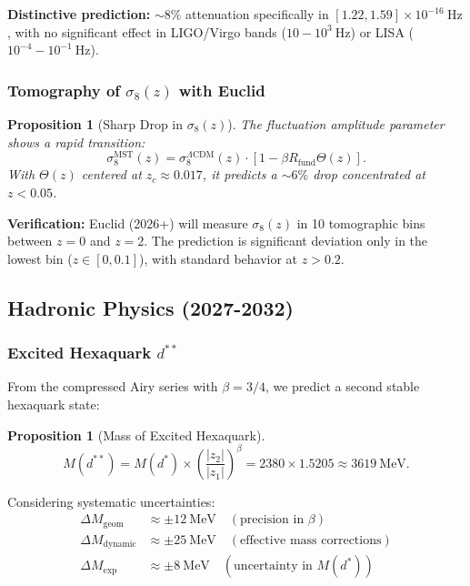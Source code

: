 \documentclass[11pt, a4paper]{article}
\theoremstyle{plain}
\newtheorem{proposition}[theorem]{Proposition}
\theoremstyle{definition}
\newcommand{\Rfactor}{R_{\text{fund}}}
\begin{document}
\textbf{Distinctive prediction:} $\sim 8\%$ attenuation specifically in $[1.22, 1.59] \times 10^{-16}\ \si{\hertz}$, with no significant effect in LIGO/Virgo bands ($10-10^3\ \si{\hertz}$) or LISA ($10^{-4}-10^{-1}\ \si{\hertz}$).

\subsubsection{Tomography of \texorpdfstring{$\sigma_8(z)$}{σ8(z)} with Euclid}

\begin{proposition}[Sharp Drop in $\sigma_8(z)$]
The fluctuation amplitude parameter shows a rapid transition:
\begin{equation}
\sigma_8^{\text{MST}}(z) = \sigma_8^{\Lambda\text{CDM}}(z) \cdot \left[1 - \beta\Rfactor \Theta(z)\right].
\end{equation}
With $\Theta(z)$ centered at $z_c \approx 0.017$, it predicts a $\sim 6\%$ drop concentrated at $z < 0.05$.
\end{proposition}

\textbf{Verification:} Euclid (2026+) will measure $\sigma_8(z)$ in 10 tomographic bins between $z=0$ and $z=2$. The prediction is significant deviation only in the lowest bin ($z \in [0, 0.1]$), with standard behavior at $z > 0.2$.

\subsection{Hadronic Physics (2027-2032)}

\subsubsection{Excited Hexaquark \texorpdfstring{$d^{**}$}{d**}}

From the compressed Airy series with $\beta = 3/4$, we predict a second stable hexaquark state:

\begin{proposition}[Mass of Excited Hexaquark]
\begin{equation}
M(d^{**}) = M(d^*) \times \left(\frac{|z_2|}{|z_1|}\right)^\beta = 2380 \times 1.5205 \approx 3619\ \si{\mega\electronvolt}.
\end{equation}
\end{proposition}

Considering systematic uncertainties:
\begin{align*}
\Delta M_{\text{geom}} &\approx \pm 12\ \si{\mega\electronvolt} \quad (\text{precision in } \beta) \\
\Delta M_{\text{dynamic}} &\approx \pm 25\ \si{\mega\electronvolt} \quad (\text{effective mass corrections}) \\
\Delta M_{\text{exp}} &\approx \pm 8\ \si{\mega\electronvolt} \quad (\text{uncertainty in } M(d^*))
\end{align*}
\end{document}
